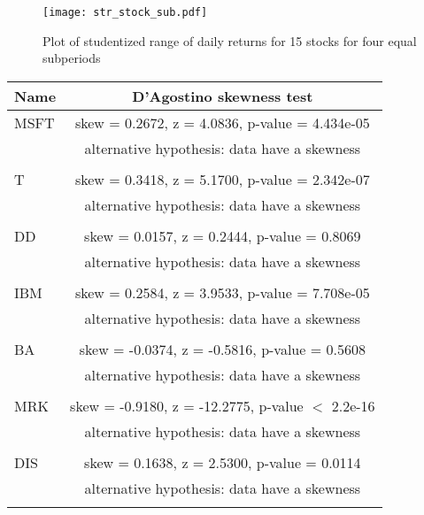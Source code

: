 \documentclass[11pt]{article}
\begin{document}
\begin{figure}
\centering
\texttt{[image: str\_stock\_sub.pdf]}
\caption{Plot of studentized range of daily returns for 15 stocks for four equal subperiods }
\label{strstocksub}
\end{figure}


\begin{table}
\centering
\tiny
\begin{tabular}{lc}
  \hline
Name&D'Agostino skewness test\\
\hline
MSFT


&skew = 0.2672, z = 4.0836, p-value = 4.434e-05\\
&alternative hypothesis: data have a skewness\\
\\
T

	


&skew = 0.3418, z = 5.1700, p-value = 2.342e-07\\
&alternative hypothesis: data have a skewness\\

\\
DD

	


&skew = 0.0157, z = 0.2444, p-value = 0.8069\\
&alternative hypothesis: data have a skewness\\

\\
IBM




&skew = 0.2584, z = 3.9533, p-value = 7.708e-05\\
&alternative hypothesis: data have a skewness\\

\\
BA

&skew = -0.0374, z = -0.5816, p-value = 0.5608\\
&alternative hypothesis: data have a skewness\\

\\
MRK

&skew = -0.9180, z = -12.2775, p-value $<$ 2.2e-16\\
&alternative hypothesis: data have a skewness\\
\\

DIS

&skew = 0.1638, z = 2.5300, p-value = 0.0114\\
&alternative hypothesis: data have a skewness\\
\\


\end{tabular}
\end{table}
\end{document}
